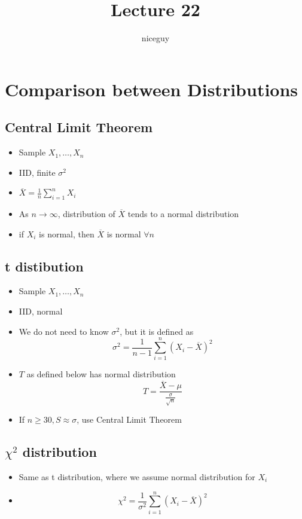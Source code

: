 \documentclass[12pt]{article}
\author{niceguy}
\title{Lecture 22}
\begin{document}
\maketitle

\section{Comparison between Distributions}

\subsection{Central Limit Theorem}

\begin{itemize}
	\item Sample $X_1,\dots,X_n$
	\item IID, finite $\sigma^2$
	\item $\overline{X} = \frac{1}{n} \sum_{i=1}^n X_i$
	\item As $n \rightarrow \infty$, distribution of $\overline{X}$ tends to a normal distribution
	\item if $X_i$ is normal, then $\overline{X}$ is normal $\forall n$
\end{itemize}

\subsection{t distibution}

\begin{itemize}
	\item Sample $X_1,\dots,X_n$
	\item IID, normal
	\item We do not need to know $\sigma^2$, but it is defined as
		$$\sigma^2 = \frac{1}{n-1} \sum_{i=1}^n (X_i-\overline{X})^2$$
	\item $T$ as defined below has normal distribution
		$$T = \frac{\overline{X}-\mu}{\frac{\sigma}{\sqrt{n}}}$$
	\item If $n \geq 30, S \approx \sigma$, use Central Limit Theorem
\end{itemize}

\subsection{$\chi^2$ distribution}

\begin{itemize}
	\item Same as t distribution, where we assume normal distribution for $X_i$
	\item $$\chi^2 = \frac{1}{\sigma^2} \sum_{i=1}^n(X_i-\overline{X})^2$$
\end{itemize}
\end{document}
